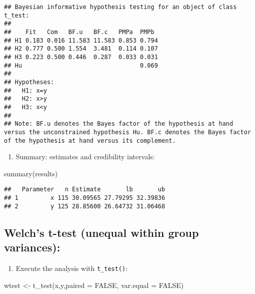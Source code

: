 \documentclass[
]{book}
\newenvironment{Shaded}{\begin{snugshade}}{\end{snugshade}}
\newcommand{\AttributeTok}[1]{\textcolor[rgb]{0.77,0.63,0.00}{#1}}
\newcommand{\ConstantTok}[1]{\textcolor[rgb]{0.00,0.00,0.00}{#1}}
\newcommand{\FunctionTok}[1]{\textcolor[rgb]{0.00,0.00,0.00}{#1}}
\newcommand{\NormalTok}[1]{#1}
\newcommand{\OtherTok}[1]{\textcolor[rgb]{0.56,0.35,0.01}{#1}}
\providecommand{\tightlist}{%
  \setlength{\itemsep}{0pt}\setlength{\parskip}{0pt}}
\begin{document}
\begin{verbatim}
## Bayesian informative hypothesis testing for an object of class t_test:
## 
##    Fit   Com   BF.u   BF.c   PMPa  PMPb 
## H1 0.183 0.016 11.583 11.583 0.853 0.794
## H2 0.777 0.500 1.554  3.481  0.114 0.107
## H3 0.223 0.500 0.446  0.287  0.033 0.031
## Hu                                 0.069
## 
## Hypotheses:
##   H1: x=y
##   H2: x>y
##   H3: x<y
## 
## Note: BF.u denotes the Bayes factor of the hypothesis at hand versus the unconstrained hypothesis Hu. BF.c denotes the Bayes factor of the hypothesis at hand versus its complement.
\end{verbatim}

\begin{enumerate}
\def\labelenumi{\arabic{enumi})}
\setcounter{enumi}{3}
\tightlist
\item
  Summary: estimates and credibility intervals:
\end{enumerate}

\begin{Shaded}
\begin{Highlighting}[]
\FunctionTok{summary}\NormalTok{(results)}
\end{Highlighting}
\end{Shaded}

\begin{verbatim}
##   Parameter   n Estimate       lb       ub
## 1         x 115 30.09565 27.79295 32.39836
## 2         y 125 28.85600 26.64732 31.06468
\end{verbatim}

\hypertarget{welchs-t-test-unequal-within-group-variances}{%
\subsection{Welch's t-test (unequal within group variances):}\label{welchs-t-test-unequal-within-group-variances}}

\begin{enumerate}
\def\labelenumi{\arabic{enumi})}
\tightlist
\item
  Execute the analysis with \texttt{t\_test()}:
\end{enumerate}

\begin{Shaded}
\begin{Highlighting}[]
\NormalTok{wtest }\OtherTok{\textless{}{-}} \FunctionTok{t\_test}\NormalTok{(x,y,}\AttributeTok{paired =} \ConstantTok{FALSE}\NormalTok{, }\AttributeTok{var.equal =} \ConstantTok{FALSE}\NormalTok{) }
\end{Highlighting}
\end{Shaded}
\end{document}
